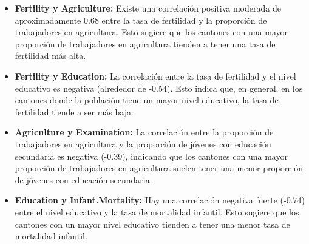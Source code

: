 \documentclass{article}
\begin{document}
\begin{itemize}
    \item \textbf{Fertility y Agriculture:} Existe una correlación positiva moderada de aproximadamente 0.68 entre la tasa de fertilidad y la proporción de trabajadores en agricultura. Esto sugiere que los cantones con una mayor proporción de trabajadores en agricultura tienden a tener una tasa de fertilidad más alta.
    \item \textbf{Fertility y Education:} La correlación entre la tasa de fertilidad y el nivel educativo es negativa (alrededor de -0.54). Esto indica que, en general, en los cantones donde la población tiene un mayor nivel educativo, la tasa de fertilidad tiende a ser más baja.
    \item \textbf{Agriculture y Examination:} La correlación entre la proporción de trabajadores en agricultura y la proporción de jóvenes con educación secundaria es negativa (-0.39), indicando que los cantones con una mayor proporción de trabajadores en agricultura suelen tener una menor proporción de jóvenes con educación secundaria.
    \item \textbf{Education y Infant.Mortality:} Hay una correlación negativa fuerte (-0.74) entre el nivel educativo y la tasa de mortalidad infantil. Esto sugiere que los cantones con un mayor nivel educativo tienden a tener una menor tasa de mortalidad infantil.
\end{itemize}
\end{document}
